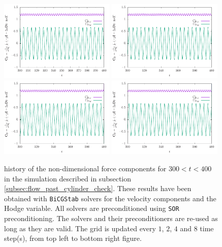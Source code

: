 \documentclass[11pt, a4paper]{article}
\theoremstyle{remark}
\begin{document}
\begin{figure}
  \centering
  \includegraphics[width=0.49\textwidth]{./results/flow_past_cylinder_smoke/optimized_run_reused_solvers_bcgs_and_pcsor/grid_update_1/force_history.pdf}
  \includegraphics[width=0.49\textwidth]{./results/flow_past_cylinder_smoke/optimized_run_reused_solvers_bcgs_and_pcsor/grid_update_2/force_history.pdf} \\
  \includegraphics[width=0.49\textwidth]{./results/flow_past_cylinder_smoke/optimized_run_reused_solvers_bcgs_and_pcsor/grid_update_4/force_history.pdf} 
  \includegraphics[width=0.49\textwidth]{./results/flow_past_cylinder_smoke/optimized_run_reused_solvers_bcgs_and_pcsor/grid_update_8/force_history.pdf} \\
 \caption{\label{fig:forces_flow_past_cylinder_reused_solvers_bcgs_and_pcsor} history of the non-dimensional force components for $300 < t < 400$ in the simulation described in subsection \ref{subsec:flow_past_cylinder_check}. These results have been obtained with \texttt{BiCGStab} solvers for the velocity components and the Hodge variable. All solvers are preconditioned using \texttt{SOR} preconditioning. The solvers and their preconditioners are re-used as long as they are valid. The grid is updated every $1$, $2$, $4$ and $8$ time step(s), from top left to bottom right figure.} 
\end{figure}
\end{document}
